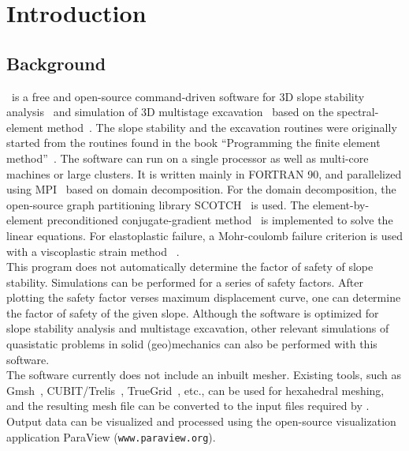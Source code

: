 \chapter{Introduction}
\section{Background}

\pack\ is a free and open-source command-driven software for 3D slope stability analysis~\citep[for more details see][]{gharti2012a} and simulation of 3D multistage excavation~\citep[for more details see][]{gharti2012b} based on the spectral-element method~\citep[e.g.,][]{patera1984,canuto1988,seriani1994,faccioli1997,komatitsch1998,komatitsch1999,peter2011}. The slope stability and the excavation routines were originally started from the routines found in the book ``Programming the finite element method''~\citep{smith2004}. The software can run on a single processor as well as multi-core machines or large clusters. It is written mainly in FORTRAN 90, and parallelized using
MPI~\citep{gropp1994,pacheco1997} based on domain decomposition. For the domain decomposition, the open-source graph partitioning library SCOTCH~\citep{pellegrini1996} is used. The element-by-element preconditioned conjugate-gradient method~\citep[e.g.,][]{hughes1983,law1986,king1987,barragy1988} is implemented to solve the linear equations. For elastoplastic failure,
a Mohr-coulomb failure criterion is used with a viscoplastic strain method~ \citep{zienkiewicz1974}.\\

This program does not automatically determine the factor of safety of slope stability. Simulations can be performed for a series of safety factors. After plotting the safety factor verses maximum displacement curve, one can determine the factor of safety of the given slope. Although the software is optimized for slope stability analysis and multistage excavation, other relevant simulations of quasistatic problems in solid (geo)mechanics can also be performed with this software.\\

The software currently does not include an inbuilt mesher. Existing tools, such as Gmsh~\citep{geuzaine2009}, CUBIT/Trelis~\citep{cubit2011}, TrueGrid~\citep{truegrid2006}, etc., can be used for hexahedral meshing, and the resulting mesh file can be converted to the input files required by \pack. Output data can be visualized and processed using the open-source visualization application ParaView (\texttt{www.paraview.org}).

